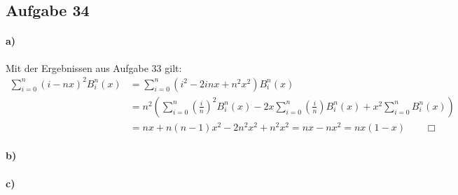 \subsection*{Aufgabe 34}

\paragraph*{a)}
Mit der Ergebnissen aus Aufgabe 33 gilt:
\begin{align*}
  \sum_{i = 0}^n (i - n x)^2 B_i^n(x) &= \sum_{i = 0}^n (i^2 - 2 i n x + n^2x^2) B_i^n(x) \\
  & = n^2 \left(\sum_{i = 0}^n \left(\frac{i}{n}\right)^2   B_i^n(x) -
    2 x \sum_{i = 0}^n \left(\frac{i}{n}\right) B_i^n(x) + x^2 \sum_{i = 0}^n B_i^n(x) \right) \\
  & =  n x + n(n-1) x^2 - 2 n^2 x^2 + n^2 x^2 = n x - n x^2 = n x (1 - x) \qquad \Box
\end{align*}

\paragraph*{b)}


\paragraph*{c)}

